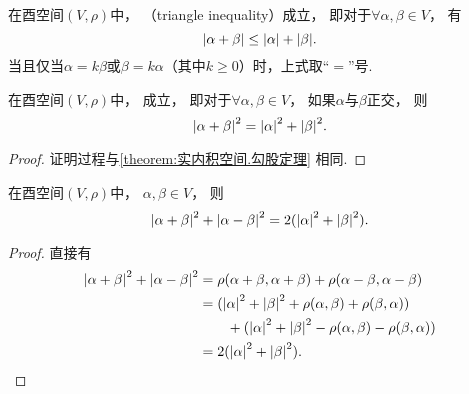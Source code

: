 \begin{corollary}\label{theorem:酉空间.三角不等式}
在酉空间\((V,\rho)\)中，
（triangle inequality）成立，
即对于\(\forall \alpha,\beta \in V\)，
有\begin{equation}
	\abs{\alpha+\beta} \leq \abs{\alpha} + \abs{\beta}.
\end{equation}
当且仅当\(\alpha = k\beta\)或\(\beta = k\alpha\)（其中\(k\geq0\)）时，上式取“\(=\)”号.
\end{corollary}

\begin{corollary}\label{theorem:酉空间.勾股定理}
在酉空间\((V,\rho)\)中，
成立，
即对于\(\forall \alpha,\beta \in V\)，
如果\(\alpha\)与\(\beta\)正交，
则\begin{equation}
	\abs{\alpha+\beta}^2 = \abs{\alpha}^2 + \abs{\beta}^2.
\end{equation}
\begin{proof}
证明过程与\cref{theorem:实内积空间.勾股定理} 相同.
\end{proof}
\end{corollary}

\begin{proposition}\label{theorem:酉空间.平行四边形等式}
在酉空间\((V,\rho)\)中，
\(\alpha,\beta \in V\)，
则\begin{equation*}
	\abs{\alpha+\beta}^2
	+ \abs{\alpha-\beta}^2
	= 2(\abs{\alpha}^2+\abs{\beta}^2).
\end{equation*}
\begin{proof}
直接有\begin{align*}
	\abs{\alpha+\beta}^2
	+ \abs{\alpha-\beta}^2
	&= \rho(\alpha+\beta,\alpha+\beta) + \rho(\alpha-\beta,\alpha-\beta) \\
	&= (\abs{\alpha}^2+\abs{\beta}^2+\rho(\alpha,\beta)+\rho(\beta,\alpha)) \\
	&\hspace{20pt}+(\abs{\alpha}^2+\abs{\beta}^2-\rho(\alpha,\beta)-\rho(\beta,\alpha)) \\
	&= 2(\abs{\alpha}^2+\abs{\beta}^2).
	\qedhere
\end{align*}
\end{proof}
\end{proposition}

